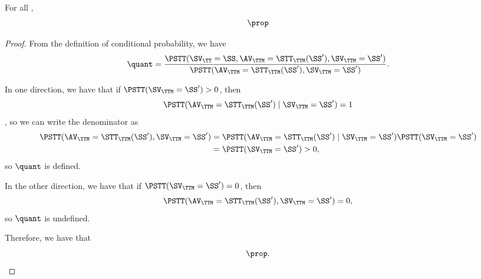 \begin{proposition}
  For all \rchreqsrng,
  $$\prop$$%
\end{proposition}

\begin{proof}
  From the definition of conditional probability, we have
  $$ \quant 
  = \frac{\PSTT(\SV_\TT = \SS, \AV_\TTM = \STT_\TTM(\SS'), \SV_\TTM = \SS')}
    {\PSTT(\AV_\TTM = \STT_\TTM(\SS'), \SV_\TTM = \SS')}.$$

  In one direction, we have that if $\PSTT(\SV_\TTM = \SS') > 0$, then 
  $$\PSTT(\AV_\TTM = \STT_\TTM(\SS')\mid \SV_\TTM = \SS') = 1$$ 
  , so
  we can write the denominator as
  \begin{align*}
    \PSTT(\AV_\TTM = \STT_\TTM(\SS'), \SV_\TTM = \SS') &= \PSTT(\AV_\TTM = \STT_\TTM(\SS')\mid \SV_\TTM = \SS')
    \PSTT(\SV_\TTM = \SS')\\
                                                     &= \PSTT(\SV_\TTM = \SS') > 0,
  \end{align*}
  so $\quant$ is defined.

  In the other direction, we have that if $\PSTT(\SV_\TTM = \SS') = 0$, then 
  $$ \PSTT(\AV_\TTM = \STT_\TTM(\SS'), \SV_\TTM = \SS') = 0,$$ 
  so $\quant$
  is undefined.

  Therefore, we have that
  $$\prop.$$%
\end{proof}
